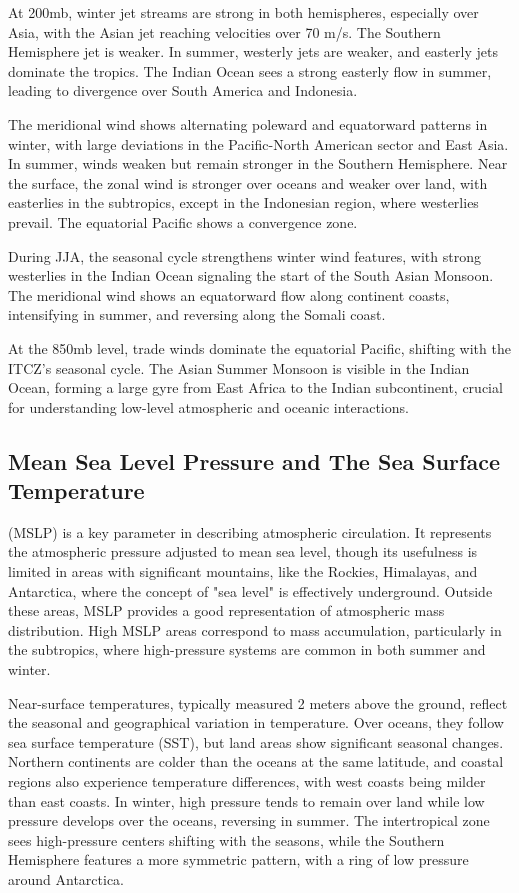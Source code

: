 At 200mb, winter jet streams are strong in both hemispheres, especially over Asia, with the Asian jet reaching velocities over 70 m/s. The Southern Hemisphere jet is weaker. In summer, westerly jets are weaker, and easterly jets dominate the tropics. The Indian Ocean sees a strong easterly flow in summer, leading to divergence over South America and Indonesia.

The meridional wind shows alternating poleward and equatorward patterns in winter, with large deviations in the Pacific-North American sector and East Asia. In summer, winds weaken but remain stronger in the Southern Hemisphere. Near the surface, the zonal wind is stronger over oceans and weaker over land, with easterlies in the subtropics, except in the Indonesian region, where westerlies prevail. The equatorial Pacific shows a convergence zone.

During JJA, the seasonal cycle strengthens winter wind features, with strong westerlies in the Indian Ocean signaling the start of the South Asian Monsoon. The meridional wind shows an equatorward flow along continent coasts, intensifying in summer, and reversing along the Somali coast.

At the 850mb level, trade winds dominate the equatorial Pacific, shifting with the ITCZ’s seasonal cycle. The Asian Summer Monsoon is visible in the Indian Ocean, forming a large gyre from East Africa to the Indian subcontinent, crucial for understanding low-level atmospheric and oceanic interactions.

\subsection{Mean Sea Level Pressure and The Sea Surface Temperature}
(MSLP) is a key parameter in describing atmospheric circulation. It represents the atmospheric pressure adjusted to mean sea level, though its usefulness is limited in areas with significant mountains, like the Rockies, Himalayas, and Antarctica, where the concept of "sea level" is effectively underground. Outside these areas, MSLP provides a good representation of atmospheric mass distribution. High MSLP areas correspond to mass accumulation, particularly in the subtropics, where high-pressure systems are common in both summer and winter.

Near-surface temperatures, typically measured 2 meters above the ground, reflect the seasonal and geographical variation in temperature. Over oceans, they follow sea surface temperature (SST), but land areas show significant seasonal changes. Northern continents are colder than the oceans at the same latitude, and coastal regions also experience temperature differences, with west coasts being milder than east coasts. In winter, high pressure tends to remain over land while low pressure develops over the oceans, reversing in summer. The intertropical zone sees high-pressure centers shifting with the seasons, while the Southern Hemisphere features a more symmetric pattern, with a ring of low pressure around Antarctica.

